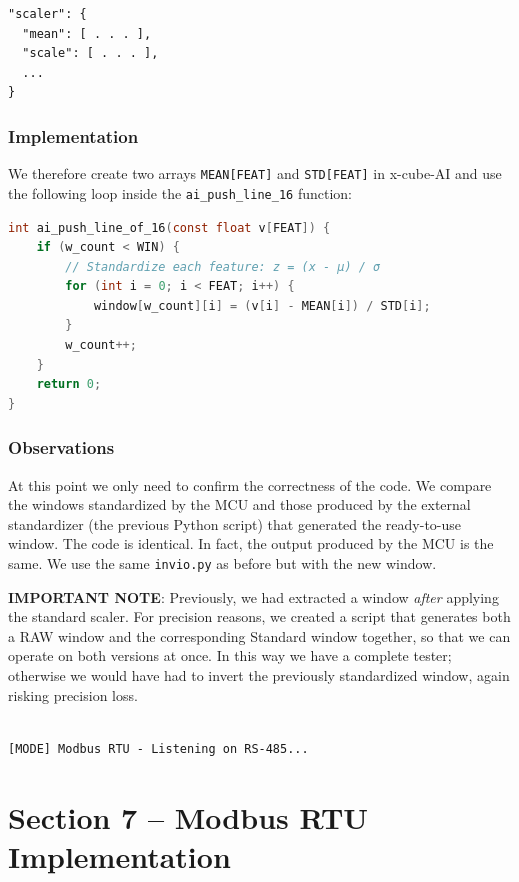 \begin{verbatim}
"scaler": {
  "mean": [ . . . ],
  "scale": [ . . . ],
  ...
}
\end{verbatim}

\subsubsection{Implementation}

We therefore create two arrays \texttt{MEAN[FEAT]} and \texttt{STD[FEAT]} in x-cube-AI and use the following loop inside the \texttt{ai\_push\_line\_16} function:

\begin{lstlisting}[language=C]
int ai_push_line_of_16(const float v[FEAT]) {
    if (w_count < WIN) {
        // Standardize each feature: z = (x - μ) / σ
        for (int i = 0; i < FEAT; i++) {
            window[w_count][i] = (v[i] - MEAN[i]) / STD[i];
        }
        w_count++;
    }
    return 0;
}
\end{lstlisting}

\subsubsection{Observations}

At this point we only need to confirm the correctness of the code. We compare the windows standardized by the MCU and those produced by the external standardizer (the previous Python script) that generated the ready-to-use window. The code is identical. In fact, the output produced by the MCU is the same. We use the same \texttt{invio.py} as before but with the new window.

\textbf{IMPORTANT NOTE}:  
Previously, we had extracted a window \emph{after} applying the standard scaler. For precision reasons, we created a script that generates both a RAW window and the corresponding Standard window together, so that we can operate on both versions at once. In this way we have a complete tester; otherwise we would have had to invert the previously standardized window, again risking precision loss.

\begin{lstlisting}

[MODE] Modbus RTU - Listening on RS-485...
\end{lstlisting}

\section{Section 7 -- Modbus RTU Implementation}

